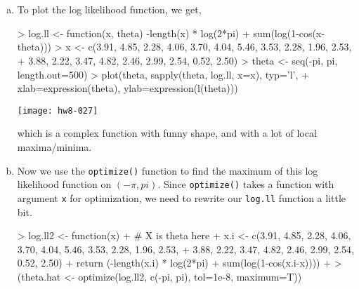 \documentclass{article}
\begin{document}
\section{}
\begin{enumerate}[(a)]
    \item To plot the log likelihood function, we get,
\begin{Schunk}
\begin{Sinput}
> log.ll <- function(x, theta) {-length(x) * log(2*pi) + sum(log(1-cos(x-theta)))}
> x <- c(3.91, 4.85, 2.28, 4.06, 3.70, 4.04, 5.46, 3.53, 2.28, 1.96, 2.53, 
+    3.88, 2.22, 3.47, 4.82, 2.46, 2.99, 2.54, 0.52, 2.50)
> theta <- seq(-pi, pi, length.out=500)
> plot(theta, sapply(theta, log.ll, x=x), typ='l',
+      xlab=expression(theta), ylab=expression(l(theta)))
\end{Sinput}
\end{Schunk}
\begin{center}
\texttt{[image: hw8-027]}
\end{center}

    which is a complex function with funny shape, and with a lot of local maxima/minima. 
    \item Now we use the \verb=optimize()= function to find the maximum of this log likelihood function on $(-\pi, pi)$. Since \verb=optimize()= takes a function with argument \verb=x= for optimization, we need to rewrite our \verb=log.ll= function a little bit.
\begin{Schunk}
\begin{Sinput}
> log.ll2 <- function(x){
+     # X is theta here
+     x.i <- c(3.91, 4.85, 2.28, 4.06, 3.70, 4.04, 5.46, 3.53, 2.28, 1.96, 2.53,
+       3.88, 2.22, 3.47, 4.82, 2.46, 2.99, 2.54, 0.52, 2.50)
+     return (-length(x.i) * log(2*pi) + sum(log(1-cos(x.i-x))))
+ }
> (theta.hat <- optimize(log.ll2, c(-pi, pi), tol=1e-8, maximum=T))
\end{Sinput}
\end{Schunk}
\end{enumerate}
\end{document}
